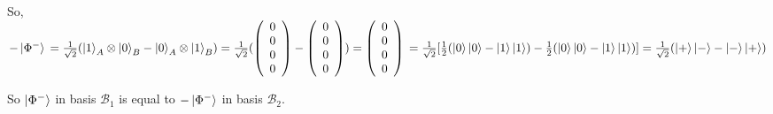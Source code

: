 \documentclass{article}
\begin{document}
\begin{enumerate}
          So, $-\ket{\Phi^-}
              \\=\frac{1}{\sqrt{2}}(\ket{1}_A\otimes\ket{0}_B-\ket{0}_A\otimes\ket{1}_B)
              \\=\frac{1}{\sqrt{2}}(\left(\begin{array}{c}
                      0 \\0\\0\\0
                  \end{array}\right)-\left(\begin{array}{c}
                      0 \\0\\0\\0
                  \end{array}\right))
              \\=\left(\begin{array}{c}
                      0 \\0\\0\\0
                  \end{array}\right)
              \\=\frac{1}{\sqrt{2}}[\frac{1}{2}(\ket{0}\ket{0}-\ket{1}\ket{1})-\frac{1}{2}(\ket{0}\ket{0}-\ket{1}\ket{1})]
              \\=\frac{1}{\sqrt{2}}(\ket{+}\ket{-}-\ket{-}\ket{+})
          $

          So $\ket{\Phi^-}$ in basis $\mathcal{B}_1$ is equal to $-\ket{\Phi^-}$ in basis $\mathcal{B}_2$.

\end{enumerate}
\end{document}
